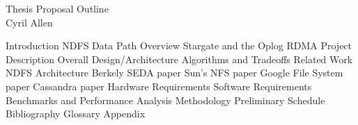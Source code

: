 \documentclass{article}
\begin{document}
\begin{center}
Thesis Proposal Outline \\
Cyril Allen
\end{center}

\begin{outline}[enumerate]
  \1 Introduction
    \2 NDFS
      \3 Data Path Overview
      \3 Stargate and the Oplog
    \2 RDMA
  \1 Project Description
  \1 Overall Design/Architecture
  \1 Algorithms and Tradeoffs
  \1 Related Work
    \2 NDFS Architecture
      \3 Berkely SEDA paper
      \3 Sun's NFS paper
      \3 Google File System paper
      \3 Cassandra paper
  \1 Hardware Requirements
  \1 Software Requirements
  \1 Benchmarks and Performance Analysis Methodology
  \1 Preliminary Schedule
  \1 Bibliography
  \1 Glossary
  \1 Appendix
\end{outline}
\end{document}

